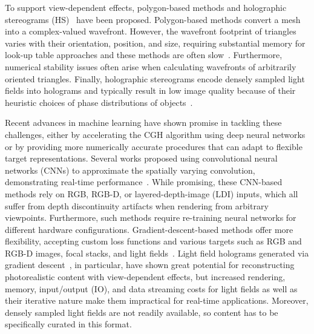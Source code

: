 To support view-dependent effects, polygon-based methods \cite{ahrenberg2008computer, kim2008mathematical, matsushima2003fast, matsushima2009extremely, matsushima2014silhouette} and holographic stereograms (HS)~\cite{kang2008accurate, benton1983survey, padmanaban2019holographic, halle1991ultragram} have been proposed. Polygon-based methods convert a mesh into a complex-valued wavefront. However, the wavefront footprint of triangles varies with their orientation, position, and size, requiring substantial memory for look-up table approaches and these methods are often slow~\cite{wang2021acceleration}. Furthermore, numerical stability issues often arise when calculating wavefronts of arbitrarily oriented triangles. Finally,  holographic stereograms encode densely sampled light fields into holograms and typically result in low image quality because of their heuristic choices of phase distributions of objects~\cite{kang2016fast, padmanaban2019holographic}. %

Recent advances in machine learning have shown promise in tackling these challenges, either by accelerating the CGH algorithm using deep neural networks or by providing more numerically accurate procedures that can adapt to flexible target representations. Several works proposed using convolutional neural networks (CNNs) to approximate the spatially varying convolution, demonstrating real-time performance~\cite{peng2020neural, shi2021towards, shi2022end, yang2022diffraction, horisaki2021three}. While promising, these CNN-based methods rely on RGB, RGB-D, or layered-depth-image (LDI) inputs, which all suffer from depth discontinuity artifacts when rendering from arbitrary viewpoints. Furthermore, such methods require re-training neural networks for different hardware configurations. Gradient-descent-based methods offer more flexibility, accepting custom loss functions and various targets such as RGB and RGB-D images, focal stacks, and light fields~\cite{kuo2023multisource, zhang20173d, chakravarthula2019wirtinger, peng2020neural, choi2021neural, choi2022time, gopakumar2024full, kavakli2023realistic, Chakravarthula2022pupil}. Light field holograms generated via gradient descent~\cite{choi2022time, kim2024holographic, schiffers2023stochastic, chao2024large}, in particular, have shown great potential for reconstructing photorealistic content with view-dependent effects, but increased rendering, memory, input/output (IO), and data streaming costs for light fields as well as their iterative nature make them impractical for real-time applications. Moreover, densely sampled light fields are not readily available, so content has to be specifically curated in this format.

